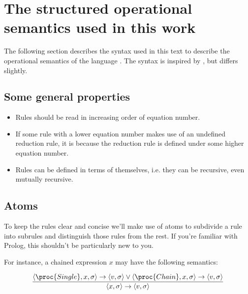 \section{The structured operational semantics used in this work}\label{appendix:sos}

The following section describes the syntax used in this text to describe the
operational semantics of the language \D{}. The syntax is inspired by
\cite{sos}, but differs slightly.

\subsection{Some general properties}

\begin{itemize}

\item Rules should be read in increasing order of equation number.

\item If some rule with a lower equation number makes use of an undefined
reduction rule, it is because the reduction rule is defined under some higher
equation number.

\item Rules can be defined in terms of themselves, i.e. they can be recursive,
even mutually recursive.

\end{itemize}

\subsection{Atoms}\label{appendix:sos:atoms}

To keep the rules clear and concise we'll make use of atoms to subdivide a rule
into subrules and distinguish those rules from the rest. If you're familiar
with Prolog, this shouldn't be particularly new to you.

For instance, a chained expression $x$ may have the following semantics: 

\begin{equation}\label{appendix:equation:expression}
{\displaystyle
  \left\langle \proc{Single}, x,\sigma\right\rangle
  \rightarrow
  \left\langle v,\sigma\right\rangle
\vee
  \left\langle \proc{Chain}, x,\sigma\right\rangle
  \rightarrow
  \left\langle v,\sigma\right\rangle
\over\displaystyle
  \left\langle x,\sigma\right\rangle
  \rightarrow
  \left\langle v,\sigma\right\rangle
}
\end{equation}

